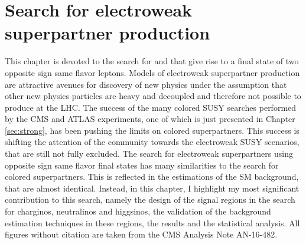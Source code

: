 \chapter{Search for electroweak \\superpartner production}\label{sec:ewk}
\noindent\justify
This chapter is devoted to the search for \firstcharg\PSGczDt and \PSGczDo\PSGczDo that give rise to a final state of two opposite sign same flavor leptons. 
Models of electroweak superpartner production are attractive avenues for discovery of new physics under the assumption that other new physics particles are heavy and decoupled and therefore not possible to produce at the LHC.  
The success of the many colored SUSY searches performed by the CMS and ATLAS experiments, one of which is just presented in Chapter \ref{sec:strong}, has been pushing the limits on colored superpartners. 
This success is shifting the attention of the community towards the electroweak SUSY scenarios, that are still not fully excluded. 
\newpara
\noindent\justify
The search for electroweak superpartners using opposite sign same flavor final states has many similarities to the search for colored superpartners. 
This is reflected in the estimations of the SM background, that are almost identical. 
Instead, in this chapter, I highlight my most significant contribution to this search, namely the design of the signal regions in the search for charginos, neutralinos and higgsinos, the validation of the background estimation techniques in these regions, the results and the statistical analysis. 
All figures without citation are taken from the CMS Analysis Note AN-16-482.
\newpage
